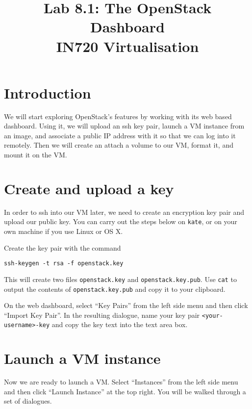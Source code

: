 \documentclass{article}
\begin{document}
\title{Lab 8.1: The OpenStack Dashboard \\ IN720 Virtualisation}
\date{}
\maketitle

\section*{Introduction}
We will start exploring OpenStack's features by working with its web based dashboard. Using it, we will upload an ssh key pair, launch a VM instance from an image, and associate a public IP address with it so that we can log into it remotely. Then we will create an attach a volume to our VM, format it, and mount it on the VM.



\section{Create and upload a key}
In order to ssh into our VM later, we need to create an encryption key pair and upload our public key. You can carry out the steps below on \texttt{kate}, or on your own machine if you use Linux or OS X.

Create the key pair with the command

\begin{verbatim}
ssh-keygen -t rsa -f openstack.key
\end{verbatim}

This will create two files \texttt{openstack.key} and \texttt{openstack.key.pub}. Use \texttt{cat} to output the contents of \texttt{openstack.key.pub} and copy it to your clipboard.

On the web dashboard, select ``Key Pairs'' from the left side menu and then click ``Import Key Pair''. In the resulting dialogue, name your key pair \texttt{<your-username>-key} and copy the key text into the text area box.

\section{Launch a VM instance}
Now we are ready to launch a VM. Select ``Instances'' from the left side menu and then click ``Launch Instance'' at the top right. You will be walked through a set of dialogues.
\end{document}
